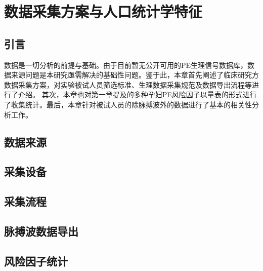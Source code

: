 \chapter{数据采集方案与人口统计学特征}
\section{引言}
数据是一切分析的前提与基础。由于目前暂无公开可用的PE生理信号数据库，数据来源问题是本研究亟需解决的基础性问题。鉴于此，本章首先阐述了临床研究方数据采集方案，对实验被试人员筛选标准、生理数据采集规范及数据导出流程等进行了介绍。
其次，本章也对第一章提及的多种孕妇PE风险因子以量表的形式进行了收集统计。最后，本章针对被试人员的除脉搏波外的数据进行了基本的相关性分析工作。
\section{数据来源}
\section{采集设备}
\section{采集流程}
\section{脉搏波数据导出}
\section{风险因子统计}

